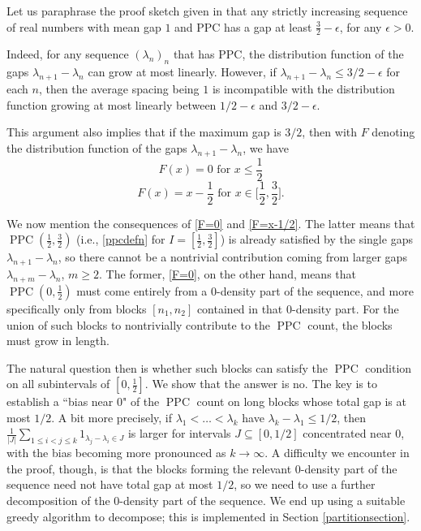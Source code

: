 \documentclass[12pt]{amsart}
\theoremstyle{definition}
\newcommand{\vs}{\vspace{3mm}}
\newcommand{\ep}{\epsilon}
\newcommand{\lam}{\lambda}
\newcommand{\sub}{\subseteq}
\DeclareMathOperator{\PPC}{PPC}
\begin{document}
\vs

Let us paraphrase the proof sketch given in \cite{abr} that any strictly increasing sequence of real numbers with mean gap $1$ and PPC has a gap at least $\frac{3}{2}-\ep$, for any $\ep > 0$. 

\vs

Indeed, for any sequence $(\lam_n)_n$ that has PPC, the distribution function of the gaps $\lam_{n+1}-\lam_n$ can grow at most linearly. However, if $\lam_{n+1}-\lam_n \le 3/2-\ep$ for each $n$, then the average spacing being $1$ is incompatible with the distribution function growing at most linearly between $1/2-\epsilon$ and $3/2-\epsilon$. 

\vs

This argument also implies that if the maximum gap is $3/2$, then with $F$ denoting the distribution function of the gaps $\lam_{n+1}-\lam_n$, we have \begin{equation}\label{F=0} F(x) = 0 \text{ for } x \le \frac{1}{2}\end{equation} \begin{equation}\label{F=x-1/2} F(x) = x-\frac{1}{2} \text{ for } x \in \big[\frac{1}{2},\frac{3}{2}\big].\end{equation}

\vs

We now mention the consequences of \eqref{F=0} and \eqref{F=x-1/2}. The latter means that $\PPC(\frac{1}{2},\frac{3}{2})$ (i.e., \eqref{ppcdefn} for $I = [\frac{1}{2},\frac{3}{2}]$) is already satisfied by the single gaps $\lam_{n+1}-\lam_n$, so there cannot be a nontrivial contribution coming from larger gaps $\lam_{n+m}-\lam_n$, $m \ge 2$. The former, \eqref{F=0}, on the other hand, means that $\PPC(0,\frac{1}{2})$ must come entirely from a $0$-density part of the sequence, and more specifically only from blocks $[n_1,n_2]$ contained in that $0$-density part. For the union of such blocks to nontrivially contribute to the $\PPC$ count, the blocks must grow in length. 

\vs

The natural question then is whether such blocks can satisfy the $\PPC$ condition on all subintervals of $[0,\frac{1}{2}]$. We show that the answer is no. The key is to establish a ``bias near $0$" of the $\PPC$ count on long blocks whose total gap is at most $1/2$. A bit more precisely, if $\lam_1 < \dots < \lam_k$ have $\lam_k -\lam_1 \le 1/2$, then $\frac{1}{|J|}\sum_{1 \le i < j \le k} 1_{\lam_j-\lam_i \in J}$ is larger for intervals $J \sub [0,1/2]$ concentrated near $0$, with the bias becoming more pronounced as $k \to \infty$. A difficulty we encounter in the proof, though, is that the blocks forming the relevant $0$-density part of the sequence need not have total gap at most $1/2$, so we need to use a further decomposition of the $0$-density part of the sequence. We end up using a suitable greedy algorithm to decompose; this is implemented in Section \ref{partitionsection}.
\end{document}

